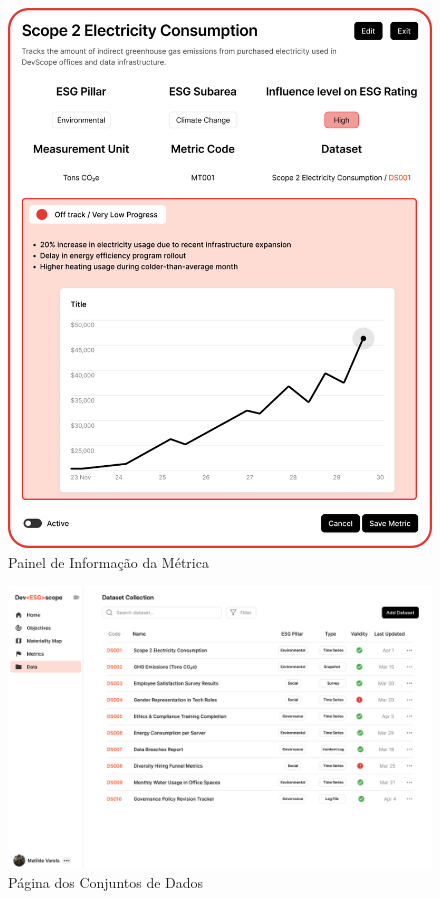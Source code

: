 \begin{figure}[H]
    \centering
    \includegraphics[width=\linewidth]{frontmatter/assets/mockup/Metric Card.png}
    \caption{Painel de Informação da Métrica}
    \label{fig:metricInfoModal}
\end{figure}


\begin{figure}[H]
    \centering
    \includegraphics[width=\linewidth]{frontmatter/assets/mockup/Data Collection Database.png}
    \caption{Página dos Conjuntos de Dados}
    \label{fig:datasetPage}
\end{figure}

